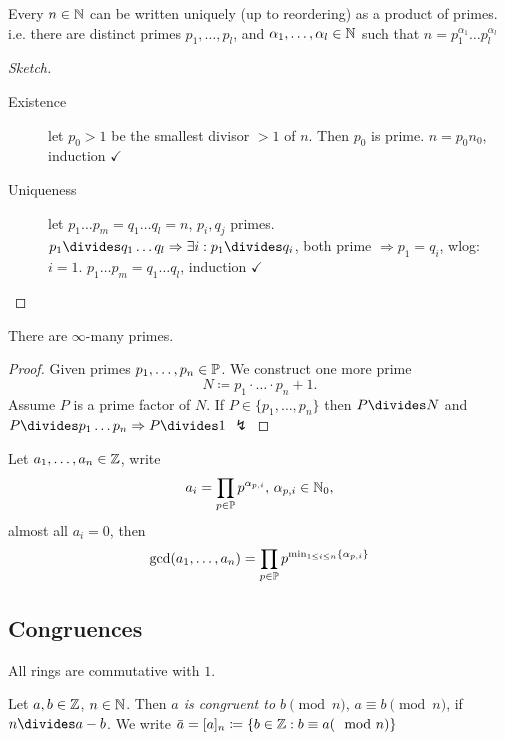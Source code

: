 \documentclass[NumTh.tex]{subfiles}
\begin{document}
\begin{theorem}
Every $n \in \mathbb{N}$ can be written uniquely (up to reordering) as a product of primes.
i.e. there are distinct primes $p_1,\dots,p_l$, and $\alpha_1,\dots,\alpha_l \in \mathbb{N}$ such that
$n = p_1^{\alpha_1} \dots p_l^{\alpha_l}$
\end{theorem}

\begin{proof}[Sketch]\hfill{}
  \begin{description}
    \item[Existence]
      let $p_0 > 1$ be the smallest divisor $> 1$ of $n$. Then $p_0$ is prime.
      $n = p_0 n_0$, induction $\checkmark$

    \item[Uniqueness]
      let $p_1 \dots p_m = q_1 \dots q_l = n$, $p_i, q_j$ primes.
      $p_1 \divides  q_1 \dots q_l \Rightarrow \exists i: p_1\divides q_i$, both prime $\Rightarrow p_1 = q_i$, wlog: $i = 1$.
      $p_1\dots p_m = q_1 \dots q_l$, induction $\checkmark$
  \end{description}
\end{proof}

\begin{theorem}[Euclid]
There are $\infty$-many primes.
\end{theorem}

\begin{proof}
  Given primes $p_1,\dots,p_n \in \mathbb{P}$. We construct one more prime \[N \coloneq p_1 \cdot \dots \cdot p_n + 1 \text{.}\]
  Assume $P$ is a prime factor of $N$.
  If $P \in \{p_1, \dots ,p_n\}$ then $P\divides N$ and $P\divides p_1\dots p_n \Rightarrow P\divides 1$ $\lightning$
\end{proof}

\begin{rem}
Let $a_1,\dots, a_n \in \mathbb{Z}$, write
\[a_i = \prod_{p \in \mathbb{P}} p^{\alpha_{p,i}}\text{, }\alpha_{p,i} \in \mathbb{N}_0 \text{,}\] almost all $a_i = 0$,
then \[\gcd(a_1,\dots,a_n) = \prod_{p \in \mathbb{P}} p^{\min_{1\leq i\leq n} \{\alpha_{p,i}\}}\]
\end{rem}

\subsection{Congruences}

All rings are commutative with $1$.

\begin{defi}
Let $a,b \in \mathbb{Z}$, $n \in \mathbb{N}$. Then \emph{$a$ is congruent to $b \pmod{n}$}, $a \equiv b \pmod{n}$,
if $n\divides  a-b$.
We write $\overbar{a} = [a]_n \coloneq \{b \in \Z : b \equiv a (\mod n)\}$
\end{defi}
\end{document}
